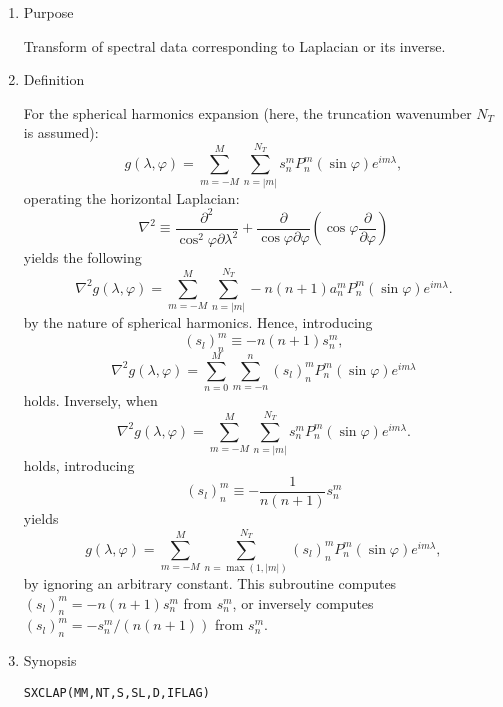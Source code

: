 \documentclass[a4paper]{scrartcl}
\begin{document}
\begin{enumerate}

\item Purpose 

Transform of spectral data 
corresponding to Laplacian or its inverse.

\item Definition

For the spherical harmonics expansion (here, the truncation
wavenumber  $N_T$ is assumed):
\begin{equation}
g(\lambda,\varphi)=\sum^M_{m=-M}\sum^{N_T}_{n=|m|}
s^m_nP^m_n(\sin\varphi)e^{im\lambda},
\end{equation}
operating the horizontal Laplacian:
\begin{equation}
\nabla^2\equiv
\frac{\partial^2}{\cos^2\varphi\partial\lambda^2}
+\frac{\partial}{\cos\varphi\partial\varphi}\left(\cos\varphi\frac{\partial}{\partial\varphi}\right)
\end{equation}
yields the following 
\begin{equation}
\nabla^2 g(\lambda,\varphi)
=\sum^M_{m=-M}\sum^{N_T}_{n=|m|}-n(n+1)a^m_nP^m_n(\sin\varphi)e^{im\lambda}.
\end{equation}
by the nature of spherical harmonics.
Hence, 
introducing
\begin{equation}
(s_l)^m_n\equiv -n(n+1)s^m_n,
\end{equation}
\begin{equation}
\nabla^2 g(\lambda,\varphi)
=\sum^M_{n=0}\sum^n_{m=-n}(s_l)^m_nP^m_n(\sin\varphi)e^{im\lambda}
\end{equation}
holds. 
Inversely, when
\begin{equation}
\nabla^2 g(\lambda,\varphi)
=\sum^M_{m=-M}\sum^{N_T}_{n=|m|}s^m_nP^m_n(\sin\varphi)e^{im\lambda}.
\end{equation}
holds, introducing
\begin{equation}
(s_l)^m_n\equiv -\frac1{n(n+1)}s^m_n
\end{equation}
yields
\begin{equation}
g(\lambda,\varphi)
=\sum^M_{m=-M}\sum^{N_T}_{n=\max(1,|m|)}
(s_l)^m_nP^m_n(\sin\varphi)e^{im\lambda},
\end{equation}
by ignoring an arbitrary constant.
This subroutine computes $(s_l)^m_n = -n(n+1)s^m_n$
from $s^m_n$, or inversely computes $(s_l)^m_n = -s^m_n/(n(n+1))$
from $s^m_n$.

\item Synopsis
    
\texttt{SXCLAP(MM,NT,S,SL,D,IFLAG)}
  

\end{enumerate}
\end{document}
